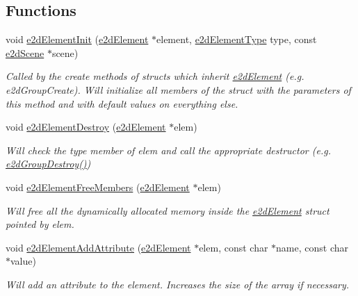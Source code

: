 \subsection*{Functions}
\begin{DoxyCompactItemize}
\item 
void \hyperlink{group__e2dElement_ga8734d10ef40a380dfc51bfe1790a92a7}{e2d\-Element\-Init} (\hyperlink{structe2dElement}{e2d\-Element} $\ast$element, \hyperlink{group__e2dElement_ga9bc8cfdec08c7e9069fc707ee456fd38}{e2d\-Element\-Type} type, const \hyperlink{structe2dScene}{e2d\-Scene} $\ast$scene)
\begin{DoxyCompactList}\small\item\em Called by the create methods of structs which inherit \hyperlink{structe2dElement}{e2d\-Element} (e.\-g. e2d\-Group\-Create). Will initialize all members of the struct with the parameters of this method and with default values on everything else. \end{DoxyCompactList}\item 
void \hyperlink{group__e2dElement_ga214c437a16fe6f3fc795539f851a2019}{e2d\-Element\-Destroy} (\hyperlink{structe2dElement}{e2d\-Element} $\ast$elem)
\begin{DoxyCompactList}\small\item\em Will check the type member of elem and call the appropriate destructor (e.\-g. \hyperlink{group__e2dGroup_ga545626effa0f89b72f244e56aadb05bc}{e2d\-Group\-Destroy()}) \end{DoxyCompactList}\item 
void \hyperlink{group__e2dElement_gae8da5104d70a09549ca74044dda8313c}{e2d\-Element\-Free\-Members} (\hyperlink{structe2dElement}{e2d\-Element} $\ast$elem)
\begin{DoxyCompactList}\small\item\em Will free all the dynamically allocated memory inside the \hyperlink{structe2dElement}{e2d\-Element} struct pointed by elem. \end{DoxyCompactList}\item 
void \hyperlink{group__e2dElement_ga5cfa0a343d3dd1a30b0addc4ec6e7f88}{e2d\-Element\-Add\-Attribute} (\hyperlink{structe2dElement}{e2d\-Element} $\ast$elem, const char $\ast$name, const char $\ast$value)
\begin{DoxyCompactList}\small\item\em Will add an attribute to the element. Increases the size of the array if necessary. \end{DoxyCompactList}\item 

\end{DoxyCompactItemize}
